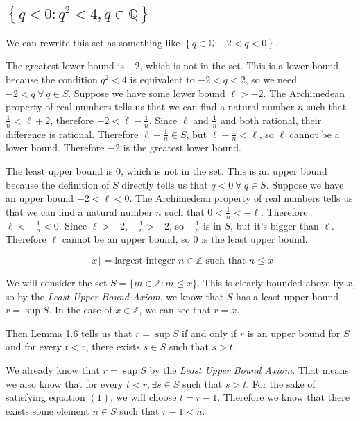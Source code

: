 \documentclass[a4paper]{article}
\begin{document}
\subsection{$\left\{ q < 0 : q^2 < 4, q \in \mathbb{Q} \right\}$}

We can rewrite this set as something like $\left\{ q \in \mathbb Q : -2 < q < 0 \right\}$.

The greatest lower bound is $-2$, which is not in the set. This is a lower bound because the condition $q^2 < 4$ is equivalent to $-2 < q < 2$, so we need $-2 < q\ \forall\ q \in S$. Suppose we have some lower bound $\ell > -2$. The Archimedean property of real numbers tells us that we can find a natural number $n$ such that $\frac1n < \ell + 2$, therefore $-2 < \ell - \frac1n$. Since $\ell$ and $\frac1n$ and both rational, their difference is rational. Therefore $\ell - \frac1n \in S$, but $\ell - \frac1n < \ell$, so $\ell$ cannot be a lower bound. Therefore $-2$ is the greatest lower bound.

The least upper bound is $0$, which is not in the set. This is an upper bound because the definition of $S$ directly tells us that $q < 0\ \forall\ q \in S$. Suppose we have an upper bound $-2 < \ell < 0$. The Archimedean property of real numbers tells us that we can find a natural number $n$ such that $0 < \frac1n < -\ell$. Therefore $\ell < -\frac1n < 0$. Since $\ell > -2$, $-\frac1n > -2$, so $-\frac1n$ is in $S$, but it's bigger than $\ell$. Therefore $\ell$ cannot be an upper bound, so $0$ is the least upper bound.


$$\lfloor x \rfloor = \text{largest integer } n \in \mathbb Z \text{ such that } n \le x$$

We will consider the set $S = \{ m \in \mathbb Z : m \le x \}$. This is clearly bounded above by $x$, so by the \textit{Least Upper Bound Axiom}, we know that $S$ has a least upper bound $r = \sup S$. In the case of $x \in \mathbb Z$, we can see that $r = x$.

Then Lemma 1.6 tells us that $r = \sup S$ if and only if $r$ is an upper bound for $S$ and for every $t < r$, there exists $s \in S$ such that $s > t$.

We already know that $r = \sup S$ by the \textit{Least Upper Bound Axiom}. That means we also know that for every $t < r, \exists s \in S$ such that $s > t$. For the sake of satisfying equation $(1)$, we will choose $t = r - 1$. Therefore we know that there exists some element $n \in S$ such that $r - 1 < n$.
\end{document}
